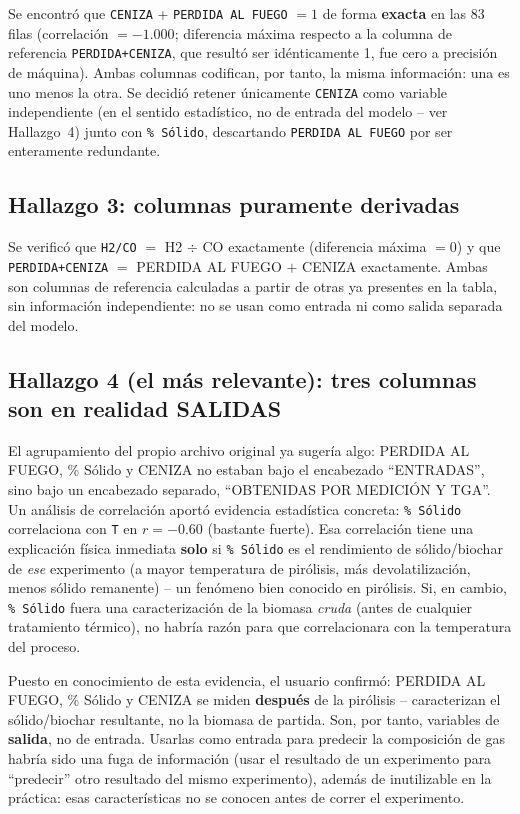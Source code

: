 \documentclass[11pt,a4paper]{article}
\begin{document}
Se encontr\'o que \texttt{CENIZA} + \texttt{PERDIDA AL FUEGO} $= 1$ de forma
\textbf{exacta} en las 83 filas (correlaci\'on $=-1.000$; diferencia m\'axima
respecto a la columna de referencia \texttt{PERDIDA+CENIZA}, que result\'o
ser id\'enticamente 1, fue cero a precisi\'on de m\'aquina). Ambas columnas
codifican, por tanto, la misma informaci\'on: una es uno menos la otra. Se
decidi\'o retener \'unicamente \texttt{CENIZA} como variable independiente
(en el sentido estad\'istico, no de entrada del modelo -- ver
Hallazgo~4) junto con \texttt{\% S\'olido}, descartando \texttt{PERDIDA AL
FUEGO} por ser enteramente redundante.

\subsection{Hallazgo 3: columnas puramente derivadas}

Se verific\'o que \texttt{H2/CO} $=$ H2 $\div$ CO exactamente (diferencia
m\'axima $=0$) y que \texttt{PERDIDA+CENIZA} $=$ PERDIDA AL FUEGO $+$ CENIZA
exactamente. Ambas son columnas de referencia calculadas a partir de otras ya
presentes en la tabla, sin informaci\'on independiente: no se usan como
entrada ni como salida separada del modelo.

\subsection{Hallazgo 4 (el m\'as relevante): tres columnas son en realidad SALIDAS}
\label{subsec:hallazgo4}

El agrupamiento del propio archivo original ya suger\'ia algo: PERDIDA AL
FUEGO, \% S\'olido y CENIZA no estaban bajo el encabezado ``ENTRADAS'', sino
bajo un encabezado separado, ``OBTENIDAS POR MEDICI\'ON Y TGA''. Un
an\'alisis de correlaci\'on aport\'o evidencia estad\'istica concreta:
\texttt{\% S\'olido} correlaciona con \texttt{T} en $r=-0.60$ (bastante
fuerte). Esa correlaci\'on tiene una explicaci\'on f\'isica inmediata
\textbf{solo} si \texttt{\% S\'olido} es el rendimiento de s\'olido/biochar
de \emph{ese} experimento (a mayor temperatura de pir\'olisis, m\'as
devolatilizaci\'on, menos s\'olido remanente) -- un fen\'omeno bien conocido
en pir\'olisis. Si, en cambio, \texttt{\% S\'olido} fuera una caracterizaci\'on
de la biomasa \emph{cruda} (antes de cualquier tratamiento t\'ermico), no
habr\'ia raz\'on para que correlacionara con la temperatura del proceso.

Puesto en conocimiento de esta evidencia, el usuario confirm\'o: PERDIDA AL
FUEGO, \% S\'olido y CENIZA se miden \textbf{despu\'es} de la pir\'olisis --
caracterizan el s\'olido/biochar resultante, no la biomasa de partida. Son,
por tanto, variables de \textbf{salida}, no de entrada. Usarlas como entrada
para predecir la composici\'on de gas habr\'ia sido una fuga de informaci\'on
(usar el resultado de un experimento para ``predecir'' otro resultado del
mismo experimento), adem\'as de inutilizable en la pr\'actica: esas
caracter\'isticas no se conocen antes de correr el experimento.
\end{document}
